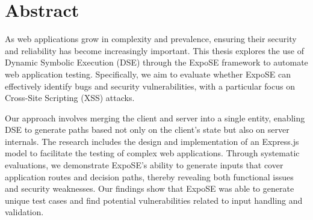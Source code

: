 \chapter*{Abstract}

As web applications grow in complexity and prevalence, ensuring their security and reliability has become increasingly important.
This thesis explores the use of Dynamic Symbolic Execution (DSE) through the ExpoSE framework to automate web application testing.
Specifically, we aim to evaluate whether ExpoSE can effectively identify bugs and security vulnerabilities, with a particular focus on Cross-Site Scripting (XSS) attacks.

Our approach involves merging the client and server into a single entity, enabling DSE to generate paths based not only on the client’s state but also on server internals.
The research includes the design and implementation of an Express.js model to facilitate the testing of complex web applications.
Through systematic evaluations, we demonstrate ExpoSE’s ability to generate inputs that cover application routes and decision paths, thereby revealing both functional issues and security weaknesses.
Our findings show that ExpoSE was able to generate unique test cases and find potential vulnerabilities related to input handling and validation.
